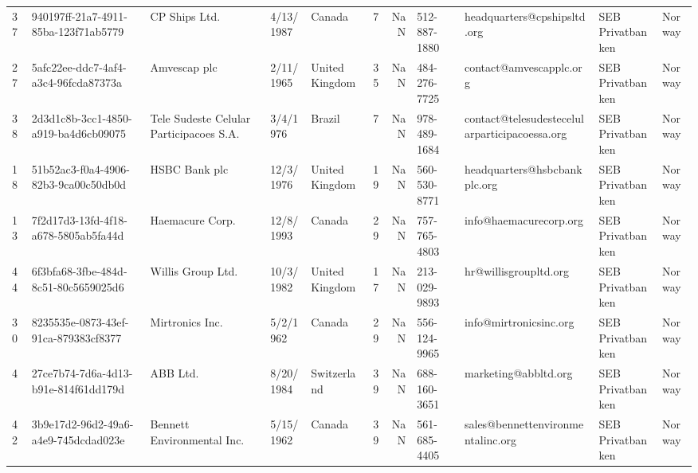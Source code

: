 \begin{tabular}{lllllrrllll}
37 &  940197ff-21a7-4911-85ba-123f71ab5779 &                             CP Ships Ltd. &      4/13/1987 &          Canada &                   7 &      NaN &  512-887-1880 &                        headquarters@cpshipsltd.org &  SEB Privatbanken &       Norway \\
27 &  5afc22ee-ddc7-4af4-a3c4-96fcda87373a &                              Amvescap plc &      2/11/1965 &  United Kingdom &                  35 &      NaN &  484-276-7725 &                            contact@amvescapplc.org &  SEB Privatbanken &       Norway \\
38 &  2d3d1c8b-3cc1-4850-a919-ba4d6cb09075 &   Tele Sudeste Celular Participacoes S.A. &       3/4/1976 &          Brazil &                   7 &      NaN &  978-489-1684 &      contact@telesudestecelularparticipacoessa.org &  SEB Privatbanken &       Norway \\
18 &  51b52ac3-f0a4-4906-82b3-9ca00c50db0d &                             HSBC Bank plc &      12/3/1976 &  United Kingdom &                  19 &      NaN &  560-530-8771 &                       headquarters@hsbcbankplc.org &  SEB Privatbanken &       Norway \\
13 &  7f2d17d3-13fd-4f18-a678-5805ab5fa44d &                           Haemacure Corp. &      12/8/1993 &          Canada &                  29 &      NaN &  757-765-4803 &                             info@haemacurecorp.org &  SEB Privatbanken &       Norway \\
44 &  6f3bfa68-3fbe-484d-8c51-80c5659025d6 &                         Willis Group Ltd. &      10/3/1982 &  United Kingdom &                  17 &      NaN &  213-029-9893 &                              hr@willisgroupltd.org &  SEB Privatbanken &       Norway \\
30 &  8235535e-0873-43ef-91ca-879383cf8377 &                           Mirtronics Inc. &       5/2/1962 &          Canada &                  29 &      NaN &  556-124-9965 &                             info@mirtronicsinc.org &  SEB Privatbanken &       Norway \\
4  &  27ce7b74-7d6a-4d13-b91e-814f61dd179d &                                  ABB Ltd. &      8/20/1984 &     Switzerland &                  39 &      NaN &  688-160-3651 &                               marketing@abbltd.org &  SEB Privatbanken &       Norway \\
42 &  3b9e17d2-96d2-49a6-a4e9-745dcdad023e &                Bennett Environmental Inc. &      5/15/1962 &          Canada &                  39 &      NaN &  561-685-4405 &                  sales@bennettenvironmentalinc.org &  SEB Privatbanken &       Norway \\
\bottomrule
\end{tabular}
